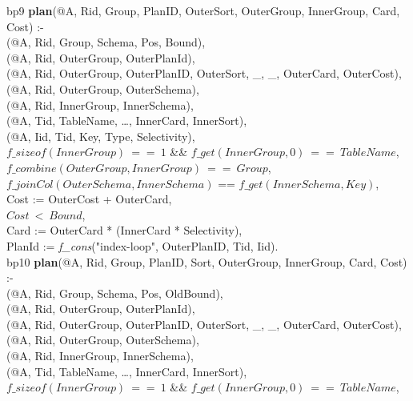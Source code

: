 \begin{figure*}
\ssp
\centering
\begin{boxedminipage}{\linewidth}
bp9 {\bf plan}(@A, Rid, Group, PlanID, OuterSort, OuterGroup, InnerGroup, Card, Cost) :- \\
(@A, Rid, Group, Schema, Pos, Bound), \\
(@A, Rid, OuterGroup, OuterPlanId), \\
(@A, Rid, OuterGroup, OuterPlanID, OuterSort, \_, \_, OuterCard, OuterCost), \\
(@A, Rid, OuterGroup, OuterSchema), \\

(@A, Rid, InnerGroup, InnerSchema), \\
(@A, Tid, TableName, \ldots, InnerCard, InnerSort),\\
(@A, Iid, Tid, Key, Type, Selectivity), \\
\datalogspace $f\_sizeof(InnerGroup)\ ==\ 1$ \&\& $f\_get(InnerGroup, 0)\ ==\ TableName$, \\

\datalogspace $f\_combine(OuterGroup, InnerGroup)\ ==\ Group$, \\
\datalogspace $f\_joinCol(OuterSchema, InnerSchema)$ == $f\_get(InnerSchema, Key)$, \\
\datalogspace Cost := OuterCost + OuterCard, \\
\datalogspace $Cost\ <\ Bound$, \\
\datalogspace Card := OuterCard * (InnerCard * Selectivity), \\ 
\datalogspace PlanId := {\em f\_cons}("index-loop", OuterPlanID, Tid, Iid). \\

bp10 {\bf plan}(@A, Rid, Group, PlanID, Sort, OuterGroup, InnerGroup, Card, Cost) :- \\
(@A, Rid, Group, Schema, Pos, OldBound), \\
(@A, Rid, OuterGroup, OuterPlanId), \\
(@A, Rid, OuterGroup, OuterPlanID, OuterSort, \_, \_, OuterCard, OuterCost), \\
(@A, Rid, OuterGroup, OuterSchema), \\

(@A, Rid, InnerGroup, InnerSchema), \\
(@A, Tid, TableName, \ldots, InnerCard, InnerSort),\\
\datalogspace $f\_sizeof(InnerGroup)\ ==\ 1$ \&\& $f\_get(InnerGroup, 0)\ ==\ TableName$, \\


\end{boxedminipage}
\end{figure*}
